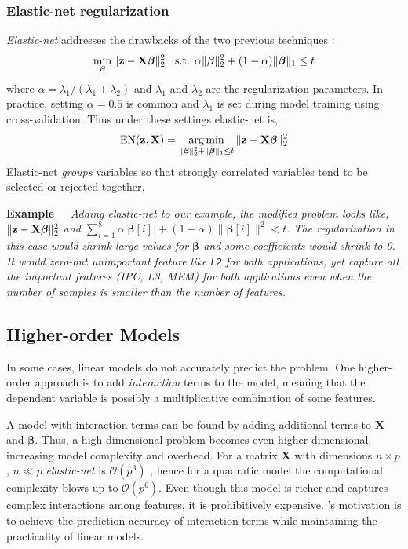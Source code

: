 \subsubsection{Elastic-net regularization}
\label{sec:est:elastic-net}
\textit{Elastic-net} addresses the drawbacks of the two previous
techniques \cite{zou2005regularization}:
\begin{equation}
\label{eq:elastic-net}
\min_{\boldsymbol{\beta}} \|\mathbf{z} - \mathbf{X}\boldsymbol{\beta} \|^2_2 \;\; \text{  s.t.  }
\alpha \| \boldsymbol{\beta} \|^2_2 + (1-\alpha)\| \boldsymbol{\beta} \|_1 \leq t
\end{equation}
where $\alpha = {\lambda_1}/({\lambda_1+\lambda_2})$ and $\lambda_1$
and $\lambda_2$ are the regularization parameters. In practice,
setting $\alpha = 0.5$ is common and $\lambda_1$ is set during model
training using cross-validation. Thus under these settings elastic-net
is,
\begin{equation}
\label{eq:elastic-net2}
\text{EN}(\mathbf{z}, \mathbf{X}) = \operatorname*{arg\,min}_{  \| \boldsymbol{\beta} \|^2_2 + \| \boldsymbol{\beta} \|_1 \leq t  } \|\mathbf{z} - \mathbf{X}\boldsymbol{\beta}\|^2_2 
\end{equation}
Elastic-net \emph{groups} variables so that strongly correlated
variables tend to be selected or rejected together.

\noindent \textbf{Example~~}\textit{ Adding elastic-net to our
  example, the modified problem looks like, $\|\mathbf{z} -
  \mathbf{X}\boldsymbol{\beta}\|^2_2$ and $\sum_{i=1}^8 \alpha
  |\boldsymbol{\beta}[i]| + (1-\alpha)\|\boldsymbol{\beta}[i]\|^2<t$.
  The regularization in this case would shrink large values for
  $\boldsymbol{\beta}$ and some coefficients would shrink to 0. It
  would zero-out unimportant feature like \texttt{L2} for both
  applications, yet capture all the important features (IPC, L3, MEM)
  for both applications even when the number of samples is smaller
  than the number of features.  }

\subsection{Higher-order Models}
In some cases, linear models do not accurately predict the problem.
One higher-order approach is to add \emph{interaction} terms to the
model, meaning that the dependent variable is possibly a
multiplicative combination of some features.

A model with interaction terms can be found by adding additional terms
to $\mathbf{X}$ and $\mathbf{\beta}$.  Thus, a high dimensional
problem becomes even higher dimensional, increasing model complexity
and overhead. For a matrix $\mathbf{X}$ with dimensions $n \times p$,
$n \ll p$ \textit{elastic-net} is $\mathcal{O}(p^3)$
\cite{zou2005regularization}, hence for a quadratic model the
computational complexity blows up to $\mathcal{O}(p^6)$.  Even though
this model is richer and captures complex interactions among features,
it is prohibitively expensive.  \SYSTEM{}'s motivation is to achieve
the prediction accuracy of interaction terms while maintaining the
practicality of linear models.

